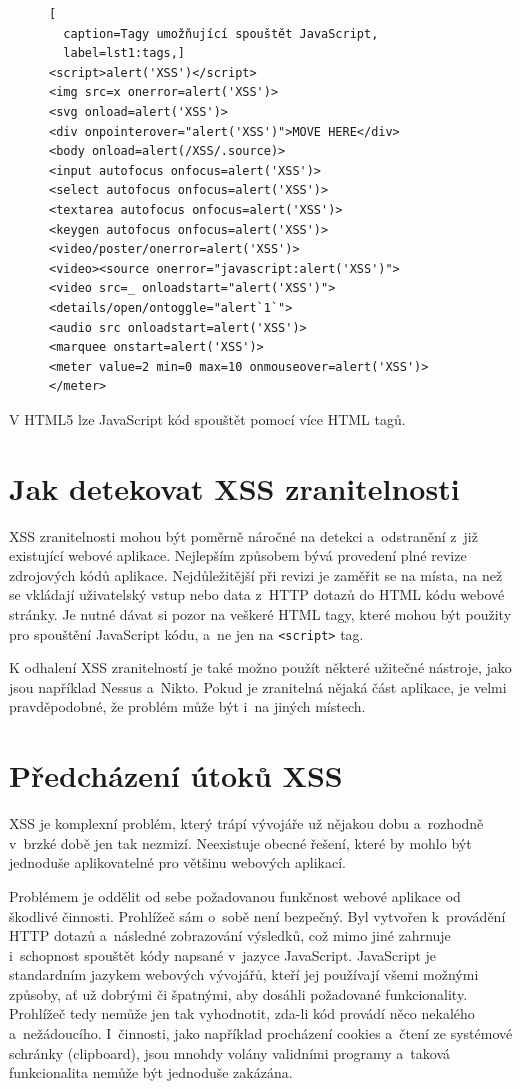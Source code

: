 \documentclass[11pt, conference, a4paper]{IEEEtran}
\begin{document}
\begin{figure}[H]
\begin{lstlisting}[
  caption=Tagy umožňující spouštět JavaScript,
  label=lst1:tags,]
<script>alert('XSS')</script>
<img src=x onerror=alert('XSS')>
<svg onload=alert('XSS')>
<div onpointerover="alert('XSS')">MOVE HERE</div>
<body onload=alert(/XSS/.source)>
<input autofocus onfocus=alert('XSS')>
<select autofocus onfocus=alert('XSS')>
<textarea autofocus onfocus=alert('XSS')>
<keygen autofocus onfocus=alert('XSS')>
<video/poster/onerror=alert('XSS')>
<video><source onerror="javascript:alert('XSS')">
<video src=_ onloadstart="alert('XSS')">
<details/open/ontoggle="alert`1`">
<audio src onloadstart=alert('XSS')>
<marquee onstart=alert('XSS')>
<meter value=2 min=0 max=10 onmouseover=alert('XSS')></meter>
\end{lstlisting}
\end{figure}

V HTML5 lze JavaScript kód spouštět pomocí více HTML tagů.~\cite{swisskyrepo2024XSS}


\section{Jak detekovat XSS zranitelnosti}
XSS zranitelnosti mohou být poměrně náročné na detekci a~odstranění z~již existující webové aplikace. Nejlepším způsobem bývá provedení plné revize zdrojových kódů aplikace. Nejdůležitější při revizi je zaměřit se na místa, na než se vkládají uživatelský vstup nebo data z~HTTP dotazů do HTML kódu webové stránky. Je nutné dávat si pozor na veškeré HTML tagy, které mohou být použity pro spouštění JavaScript kódu, a~ne jen na \texttt{<script>} tag.

K odhalení XSS zranitelností je také možno použít některé užitečné nástroje, jako jsou například Nessus a~Nikto. Pokud je zranitelná nějaká část aplikace, je velmi pravděpodobné, že problém může být i~na jiných místech.



\section{Předcházení útoků XSS}
XSS je komplexní problém, který trápí vývojáře už nějakou dobu a~rozhodně v~brzké době jen tak nezmizí. Neexistuje obecné řešení, které by mohlo být jednoduše aplikovatelné pro většinu webových aplikací.

Problémem je oddělit od sebe požadovanou funkčnost webové aplikace od škodlivé činnosti. Prohlížeč sám o~sobě není bezpečný. Byl vytvořen k~provádění HTTP dotazů a~následné zobrazování výsledků, což mimo jiné zahrnuje i~schopnost spouštět kódy napsané v~jazyce JavaScript. JavaScript je standardním jazykem webových vývojářů, kteří jej používají všemi možnými způsoby, ať už dobrými či špatnými, aby dosáhli požadované funkcionality. Prohlížeč tedy nemůže jen tak vyhodnotit, zda-li kód provádí něco nekalého a~nežádoucího. I~činnosti, jako například procházení cookies a~čtení ze systémové schránky (clipboard), jsou mnohdy volány validními programy a~taková funkcionalita nemůže být jednoduše zakázána.
\end{document}
